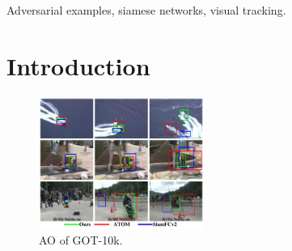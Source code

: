 \documentclass[journal]{IEEEtran}
\begin{document}
\begin{IEEEkeywords}
Adversarial examples, siamese networks, visual tracking.
\end{IEEEkeywords}


\IEEEpeerreviewmaketitle


\section{Introduction}

\begin{figure}[t]
    \centering
    \includegraphics[width=0.48\textwidth]{images/got10k/visulization.pdf}
    \caption{AO of GOT-10k.}
\end{figure}
\end{document}
